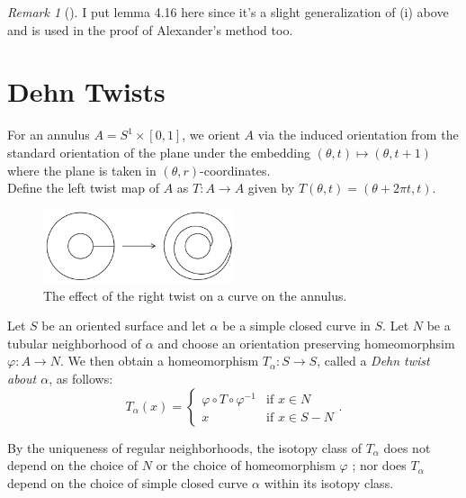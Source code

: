 \documentclass[reqno]{amsart}
\theoremstyle{definition}
\theoremstyle{remark}
\newtheorem*{remark}{Remark}
\begin{document}
\begin{remark}[]
    I put lemma 4.16 here since it's a slight generalization of
    (i) above and is used in the proof of Alexander's method
    too.
\end{remark}



\section{Dehn Twists}

For an annulus $A = S^{1} \times \left[ 0,1 \right]$, we
orient $A$ via the induced orientation from
the standard orientation of the plane under the
embedding 
$\left( \theta, t \right) \mapsto 
\left( \theta, t+1 \right) $ where
the plane is taken in $\left( \theta, r \right) $-coordinates.\\

Define the left twist map of $A$ as $T \colon A \to A$ given
by
$T\left( \theta, t \right) = \left( \theta
+ 2\pi t, t\right) $.

\begin{figure}[H]
    \centering
    \includegraphics[width=0.5\textwidth]{dehn-twist-annulus.png}
    \caption{The effect of the right twist on a curve
    on the annulus.}
    \label{fig:dehn-twist-annulus-png}
\end{figure}

Let $S$ be an oriented surface and let $\alpha$ be
a simple closed curve in $S$. Let $N$ be a tubular
neighborhood of $\alpha$ and choose
an orientation preserving homeomorphsim
$\varphi \colon A \to N$. We then obtain
a homeomorphism $T_{\alpha} \colon
S \to S$, called a \textit{Dehn twist about $\alpha$}, as
follows:
\[
T_{\alpha}(x) = 
\begin{cases}
    \varphi \circ T \circ \varphi^{-1}& \text{if } 
    x\in N \\
    x& \text{if } x\in S - N
\end{cases}.
\] 

By the uniqueness of regular neighborhoods, the isotopy
class of $T_{\alpha}$ does not depend on the choice of
$N$ or the choice of homeomorphism $\varphi$ \cite[Theorem 1.8]{Hempel}; nor
does $T_{\alpha}$ depend on the choice
of simple closed curve $\alpha$ within its isotopy class. 
\end{document}
